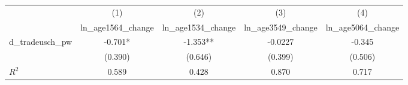 {
\def\sym#1{\ifmmode^{#1}\else\(^{#1}\)\fi}
\begin{tabular}{l*{4}{c}}
\hline\hline
                    &\multicolumn{1}{c}{(1)}&\multicolumn{1}{c}{(2)}&\multicolumn{1}{c}{(3)}&\multicolumn{1}{c}{(4)}\\
                    &\multicolumn{1}{c}{ln\_age1564\_change}&\multicolumn{1}{c}{ln\_age1534\_change}&\multicolumn{1}{c}{ln\_age3549\_change}&\multicolumn{1}{c}{ln\_age5064\_change}\\
\hline
d\_tradeusch\_pw      &      -0.701*  &      -1.353** &     -0.0227   &      -0.345   \\
                    &     (0.390)   &     (0.646)   &     (0.399)   &     (0.506)   \\
\hline
\(R^{2}\)           &       0.589   &       0.428   &       0.870   &       0.717   \\
\hline\hline
\end{tabular}
}
